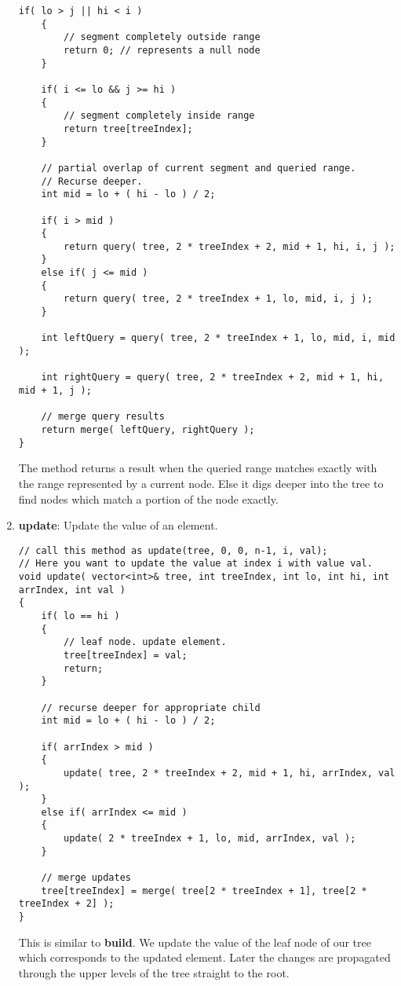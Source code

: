 \begin{enumerate}
\begin{lstlisting}[style=customc, caption={Query/Read}]
    if( lo > j || hi < i )
    {
        // segment completely outside range
        return 0; // represents a null node
    }

    if( i <= lo && j >= hi )
    {
        // segment completely inside range
        return tree[treeIndex];
    }

    // partial overlap of current segment and queried range.
    // Recurse deeper.
    int mid = lo + ( hi - lo ) / 2;

    if( i > mid )
    {
        return query( tree, 2 * treeIndex + 2, mid + 1, hi, i, j );
    }
    else if( j <= mid )
    {
        return query( tree, 2 * treeIndex + 1, lo, mid, i, j );
    }

    int leftQuery = query( tree, 2 * treeIndex + 1, lo, mid, i, mid );

    int rightQuery = query( tree, 2 * treeIndex + 2, mid + 1, hi, mid + 1, j );

    // merge query results
    return merge( leftQuery, rightQuery );
}
\end{lstlisting}
The method returns a result when the queried range matches exactly with the range represented by a current node. Else it digs deeper into the tree to find nodes which match a portion of the node exactly.

\item \textbf{update}: Update the value of an element.

\begin{lstlisting}[style=customc, caption={Update}]
// call this method as update(tree, 0, 0, n-1, i, val);
// Here you want to update the value at index i with value val.
void update( vector<int>& tree, int treeIndex, int lo, int hi, int arrIndex, int val )
{
    if( lo == hi )
    {
        // leaf node. update element.
        tree[treeIndex] = val;
        return;
    }

    // recurse deeper for appropriate child
    int mid = lo + ( hi - lo ) / 2;

    if( arrIndex > mid )
    {
        update( tree, 2 * treeIndex + 2, mid + 1, hi, arrIndex, val );
    }
    else if( arrIndex <= mid )
    {
        update( 2 * treeIndex + 1, lo, mid, arrIndex, val );
    }

    // merge updates
    tree[treeIndex] = merge( tree[2 * treeIndex + 1], tree[2 * treeIndex + 2] );
}
\end{lstlisting}
This is similar to \textbf{build}. We update the value of the leaf node of our tree which corresponds to the updated element. Later the changes are propagated through the upper levels of the tree straight to the root.
\end{enumerate}

